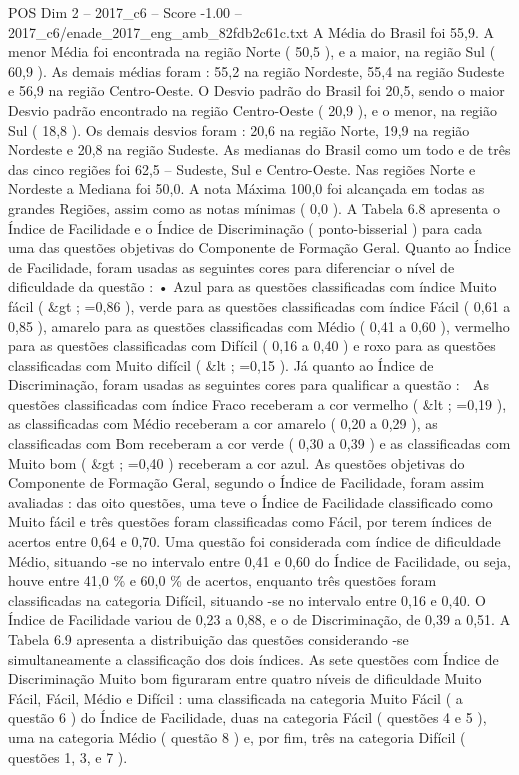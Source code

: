 \begin{textsample}{POS Dim 2 – 2017\_c6 – Score -1.00 – 2017\_c6/enade\_2017\_eng\_amb\_82fdb2c61c.txt}
A Média do Brasil foi 55,9.
A menor Média foi encontrada na região Norte ( 50,5 ), e a maior, na região Sul ( 60,9 ).
As demais médias foram : 55,2 na região Nordeste, 55,4 na região Sudeste e 56,9 na região Centro-Oeste.
O Desvio padrão do Brasil foi 20,5, sendo o maior Desvio padrão encontrado na região Centro-Oeste ( 20,9 ), e o menor, na região Sul ( 18,8 ).
Os demais desvios foram : 20,6 na região Norte, 19,9 na região Nordeste e 20,8 na região Sudeste.
As medianas do Brasil como um todo e de três das cinco regiões foi 62,5 – Sudeste, Sul e Centro-Oeste.
Nas regiões Norte e Nordeste a Mediana foi 50,0.
A nota Máxima 100,0 foi alcançada em todas as grandes Regiões, assim como as notas mínimas ( 0,0 ).
A Tabela 6.8 apresenta o Índice de Facilidade e o Índice de Discriminação ( ponto-bisserial ) para cada uma das questões objetivas do Componente de Formação Geral.
Quanto ao Índice de Facilidade, foram usadas as seguintes cores para diferenciar o nível de dificuldade da questão : • Azul para as questões classificadas com índice Muito fácil ( \&gt ; =0,86 ), verde para as questões classificadas com índice Fácil ( 0,61 a 0,85 ), amarelo para as questões classificadas com Médio ( 0,41 a 0,60 ), vermelho para as questões classificadas com Difícil ( 0,16 a 0,40 ) e roxo para as questões classificadas com Muito difícil ( \&lt ; =0,15 ).
Já quanto ao Índice de Discriminação, foram usadas as seguintes cores para qualificar a questão :  As questões classificadas com índice Fraco receberam a cor vermelho ( \&lt ; =0,19 ), as classificadas com Médio receberam a cor amarelo ( 0,20 a 0,29 ), as classificadas com Bom receberam a cor verde ( 0,30 a 0,39 ) e as classificadas com Muito bom ( \&gt ; =0,40 ) receberam a cor azul.
As questões objetivas do Componente de Formação Geral, segundo o Índice de Facilidade, foram assim avaliadas : das oito questões, uma teve o Índice de Facilidade classificado como Muito fácil e três questões foram classificadas como Fácil, por terem índices de acertos entre 0,64 e 0,70.
Uma questão foi considerada com índice de dificuldade Médio, situando -se no intervalo entre 0,41 e 0,60 do Índice de Facilidade, ou seja, houve entre 41,0 \% e 60,0 \% de acertos, enquanto três questões foram classificadas na categoria Difícil, situando -se no intervalo entre 0,16 e 0,40.
O Índice de Facilidade variou de 0,23 a 0,88, e o de Discriminação, de 0,39 a 0,51.
A Tabela 6.9 apresenta a distribuição das questões considerando -se simultaneamente a classificação dos dois índices.
As sete questões com Índice de Discriminação Muito bom figuraram entre quatro níveis de dificuldade Muito Fácil, Fácil, Médio e Difícil : uma classificada na categoria Muito Fácil ( a questão 6 ) do Índice de Facilidade, duas na categoria Fácil ( questões 4 e 5 ), uma na categoria Médio ( questão 8 ) e, por fim, três na categoria Difícil ( questões 1, 3, e 7 ).

\end{textsample}
